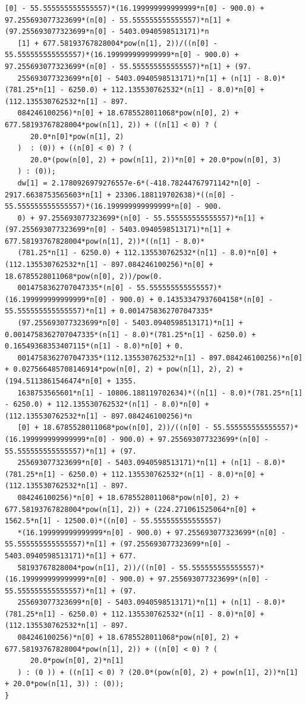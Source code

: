 \begin{lstlisting}[style=CStyle]
   [0] - 55.555555555555557)*(16.199999999999999*n[0] - 900.0) + 97.255693077323699*(n[0] - 55.555555555555557)*n[1] + (97.255693077323699*n[0] - 5403.0940598513171)*n
   [1] + 677.58193767828004*pow(n[1], 2))/((n[0] - 55.555555555555557)*(16.199999999999999*n[0] - 900.0) + 97.255693077323699*(n[0] - 55.555555555555557)*n[1] + (97.
   255693077323699*n[0] - 5403.0940598513171)*n[1] + (n[1] - 8.0)*(781.25*n[1] - 6250.0) + 112.135530762532*(n[1] - 8.0)*n[0] + (112.135530762532*n[1] - 897.
   084246100256)*n[0] + 18.6785528011068*pow(n[0], 2) + 677.58193767828004*pow(n[1], 2)) + ((n[1] < 0) ? (
      20.0*n[0]*pow(n[1], 2)
   )  : (0)) + ((n[0] < 0) ? (
      20.0*(pow(n[0], 2) + pow(n[1], 2))*n[0] + 20.0*pow(n[0], 3)
   ) : (0));
   dw[1] = 2.1780926979276557e-6*(-418.78244767971142*n[0] - 2917.6638753565603*n[1] + 23306.188119702638)*((n[0] - 55.555555555555557)*(16.199999999999999*n[0] - 900.
   0) + 97.255693077323699*(n[0] - 55.555555555555557)*n[1] + (97.255693077323699*n[0] - 5403.0940598513171)*n[1] + 677.58193767828004*pow(n[1], 2))*((n[1] - 8.0)*
   (781.25*n[1] - 6250.0) + 112.135530762532*(n[1] - 8.0)*n[0] + (112.135530762532*n[1] - 897.084246100256)*n[0] + 18.6785528011068*pow(n[0], 2))/pow(0.
   0014758362707047335*(n[0] - 55.555555555555557)*(16.199999999999999*n[0] - 900.0) + 0.14353347937604158*(n[0] - 55.555555555555557)*n[1] + 0.0014758362707047335*
   (97.255693077323699*n[0] - 5403.0940598513171)*n[1] + 0.0014758362707047335*(n[1] - 8.0)*(781.25*n[1] - 6250.0) + 0.16549368353407115*(n[1] - 8.0)*n[0] + 0.
   0014758362707047335*(112.135530762532*n[1] - 897.084246100256)*n[0] + 0.027566485708146914*pow(n[0], 2) + pow(n[1], 2), 2) + (194.5113861546474*n[0] + 1355.
   1638753565601*n[1] - 10806.188119702634)*((n[1] - 8.0)*(781.25*n[1] - 6250.0) + 112.135530762532*(n[1] - 8.0)*n[0] + (112.135530762532*n[1] - 897.084246100256)*n
   [0] + 18.6785528011068*pow(n[0], 2))/((n[0] - 55.555555555555557)*(16.199999999999999*n[0] - 900.0) + 97.255693077323699*(n[0] - 55.555555555555557)*n[1] + (97.
   255693077323699*n[0] - 5403.0940598513171)*n[1] + (n[1] - 8.0)*(781.25*n[1] - 6250.0) + 112.135530762532*(n[1] - 8.0)*n[0] + (112.135530762532*n[1] - 897.
   084246100256)*n[0] + 18.6785528011068*pow(n[0], 2) + 677.58193767828004*pow(n[1], 2)) + (224.271061525064*n[0] + 1562.5*n[1] - 12500.0)*((n[0] - 55.555555555555557)
   *(16.199999999999999*n[0] - 900.0) + 97.255693077323699*(n[0] - 55.555555555555557)*n[1] + (97.255693077323699*n[0] - 5403.0940598513171)*n[1] + 677.
   58193767828004*pow(n[1], 2))/((n[0] - 55.555555555555557)*(16.199999999999999*n[0] - 900.0) + 97.255693077323699*(n[0] - 55.555555555555557)*n[1] + (97.
   255693077323699*n[0] - 5403.0940598513171)*n[1] + (n[1] - 8.0)*(781.25*n[1] - 6250.0) + 112.135530762532*(n[1] - 8.0)*n[0] + (112.135530762532*n[1] - 897.
   084246100256)*n[0] + 18.6785528011068*pow(n[0], 2) + 677.58193767828004*pow(n[1], 2)) + ((n[0] < 0) ? (
      20.0*pow(n[0], 2)*n[1]
   ) : (0 )) + ((n[1] < 0) ? (20.0*(pow(n[0], 2) + pow(n[1], 2))*n[1] + 20.0*pow(n[1], 3)) : (0));
}
\end{lstlisting}
